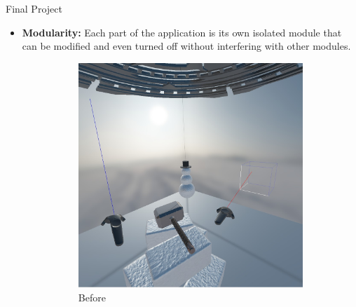 \documentclass[final]{beamer}
\newlength{\onecolwid}
\begin{document}
\begin{frame}[t]
\begin{columns}[t]
\begin{column}{\onecolwid}
\begin{block}{Final Project}
\begin{itemize}
                        \item \textbf{Modularity:} Each part of the application
                            is its own isolated module that can be modified and
                            even turned off without interfering with other
                            modules.
                            \begin{figure}[H]
                                \begin{subfigure}{0.5\linewidth}
                                    \centering
                                    \includegraphics[width=0.95\linewidth]{../report/screenshots/toggle_a.jpg}
                                    \caption{Before}
                                \end{subfigure}%
                                \begin{subfigure}{0.5\linewidth}
                                    \centering

\end{subfigure}
\end{figure}
\end{itemize}
\end{block}
\end{column}
\end{columns}
\end{frame}
\end{document}
